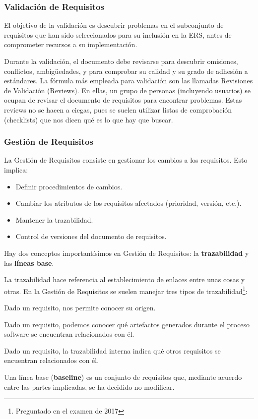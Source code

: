 \subsubsection{Validación de Requisitos}
\label{sec:requisitos:validacion}

El objetivo de la validación es descubrir problemas en el subconjunto
de requisitos que han sido seleccionados para su inclusión en la ERS,
antes de comprometer recursos a su implementación.

Durante la validación, el documento debe revisarse para descubrir
omisiones, conflictos, ambigüedades, y para comprobar su calidad y su
grado de adhesión a estándares. La fórmula más empleada para
validación son las llamadas Revisiones de Validación (Reviews). En
ellas, un grupo de personas (incluyendo usuarios) se ocupan de revisar
el documento de requisitos para encontrar problemas. Estas reviews no
se hacen a ciegas, pues se suelen utilizar listas de comprobación
(checklists) que nos dicen qué es lo que hay que buscar.

\subsubsection{Gestión de Requisitos}
\label{sec:requisitos:gestion}

La Gestión de Requisitos consiste en gestionar los cambios a los
requisitos. Esto implica:

\begin{itemize}[noitemsep]
\item Definir procedimientos de cambios.
\item Cambiar los atributos de los requisitos afectados (prioridad, versión, etc.).
\item Mantener la trazabilidad.
\item Control de versiones del documento de requisitos.
\end{itemize}

Hay dos conceptos importantísimos en Gestión de Requisitos: la \textbf{trazabilidad} y las \textbf{líneas base}.

La trazabilidad hace referencia al establecimiento de enlaces entre
unas cosas y otras. En la Gestión de Requisitos se suelen manejar tres
tipos de trazabilidad\footnote{Preguntado en el examen de 2017}:

\begin{description}[noitemsep]
\item [Trazabilidad hacia atrás] Dado un requisito, nos permite conocer
  su origen.
\item [Trazabilidad hacia delante] Dado un requisito, podemos conocer
  qué artefactos generados durante el proceso software se encuentran
  relacionados con él.
\item [Trazabilidad interna] Dado un requisito, la trazabilidad interna
  indica qué otros requisitos se encuentran relacionados con él.
\end{description}

Una línea base (\textbf{baseline}) es un conjunto de requisitos que, mediante acuerdo entre las partes
implicadas, se ha decidido no modificar.

